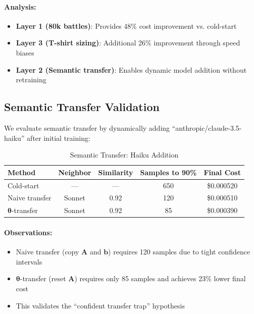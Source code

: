 \documentclass[sigconf]{acmart}
\begin{document}
\paragraph{Analysis:}
\begin{itemize}
    \item \textbf{Layer 1 (80k battles)}: Provides 48\% cost improvement vs. cold-start
    \item \textbf{Layer 3 (T-shirt sizing)}: Additional 26\% improvement through speed biases
    \item \textbf{Layer 2 (Semantic transfer)}: Enables dynamic model addition without retraining
\end{itemize}

\subsection{Semantic Transfer Validation}

We evaluate semantic transfer by dynamically adding ``anthropic/claude-3.5-haiku'' after initial training:

\begin{table}[h]
\centering
\caption{Semantic Transfer: Haiku Addition}
\label{tab:transfer}
\begin{tabular}{@{}lcccc@{}}
\toprule
Method & Neighbor & Similarity & Samples to 90\% & Final Cost \\
\midrule
Cold-start & --- & --- & 650 & \$0.000520 \\
Naive transfer & Sonnet & 0.92 & 120 & \$0.000510 \\
$\boldsymbol{\theta}$-transfer & Sonnet & 0.92 & 85 & \$0.000390 \\
\bottomrule
\end{tabular}
\end{table}

\paragraph{Observations:}
\begin{itemize}
    \item Naive transfer (copy $\mathbf{A}$ and $\mathbf{b}$) requires 120 samples due to tight confidence intervals
    \item $\boldsymbol{\theta}$-transfer (reset $\mathbf{A}$) requires only 85 samples and achieves 23\% lower final cost
    \item This validates the ``confident transfer trap'' hypothesis
\end{itemize}
\end{document}
